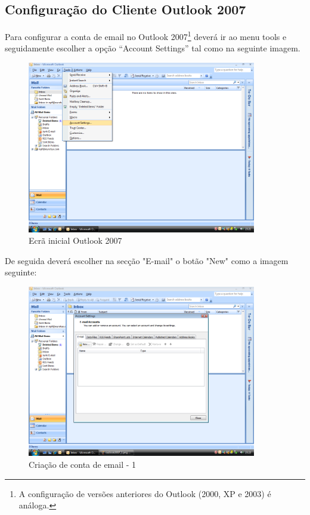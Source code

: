 \subsection{Configuração do Cliente Outlook 2007}

Para configurar a conta de email no Outlook 2007\footnote{A configuração de versões anteriores do Outlook (2000, XP e 2003) é análoga.} deverá ir ao menu tools e seguidamente escolher a opção ``Account Settings'' tal como na seguinte imagem.

\begin{figure}[H]
    \begin{center}
        \includegraphics[width=10cm]{include/img/outlook2007_1}
    \end{center}
    \caption{Ecrã inicial Outlook 2007}
    \label{fig:OUTLK2k71}
\end{figure}

De seguida deverá escolher na secção "E-mail" o botão "New" como a imagem seguinte:

\begin{figure}[H]
    \begin{center}
        \includegraphics[width=10cm]{include/img/outlook2007_2}
    \end{center}
    \caption{Criação de conta de email - 1}
    \label{fig:OUTLK2k72}
\end{figure}

